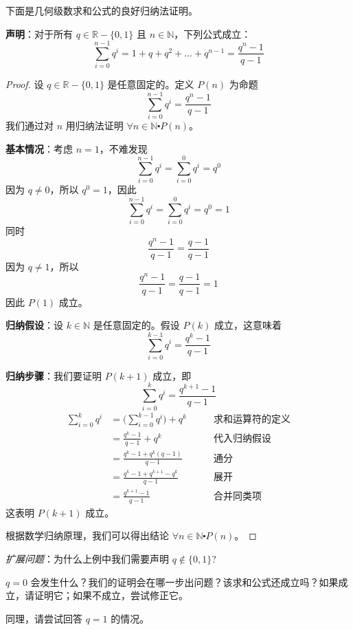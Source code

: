 下面是几何级数求和公式的良好归纳法证明。\\

\begin{example}[几何级数求和公式]
    
    \textbf{声明}：对于所有 $q \in \mathbb{R}-\{0,1\}$ 且 $n \in \mathbb{N}$，下列公式成立：
    \[\sum_{i=0}^{n-1}q^i = 1+q+q^2+\dots+q^{n-1} = \frac{q^n-1}{q-1}\]
\end{example}

\begin{proof}
    设 $q \in \mathbb{R}-\{0,1\}$ 是任意固定的。定义 $P(n)$ 为命题
    \[\sum_{i=0}^{n-1}q^i = \frac{q^n-1}{q-1}\]
    我们通过对 $n$ 用归纳法证明 $\forall n \in \mathbb{N} \centerdot P(n)$。

    \textbf{基本情况}：考虑 $n=1$，不难发现
    \[\sum_{i=0}^{n-1}q^i = \sum_{i=0}^{0}q^i = q^0\]
    因为 $q \neq 0$，所以 $q^0=1$，因此
    \[\sum_{i=0}^{n-1}q^i = \sum_{i=0}^{0}q^i = q^0 = 1\]
    同时
    \[\frac{q^n-1}{q-1} = \frac{q-1}{q-1}\]
    因为 $q \neq 1$，所以
    \[\frac{q^n-1}{q-1} = \frac{q-1}{q-1} = 1\]
    因此 $P(1)$ 成立。

    \textbf{归纳假设}：设 $k \in \mathbb{N}$ 是任意固定的。假设 $P(k)$ 成立，这意味着
    \[\sum_{i=0}^{k-1}q^i = \frac{q^k-1}{q-1}\]

    \textbf{归纳步骤}：我们要证明 $P(k+1)$ 成立，即
    \[\sum_{i=0}^{k}q^i = \frac{q^{k+1}-1}{q-1}\]
    \begin{align*}
        \sum_{i=0}^{k}q^i &= \Bigg(\sum_{i=0}^{k-1}q^i\Bigg)+q^k &\qquad \text{求和运算符的定义}\\
        &= \frac{q^k-1}{q-1} + q^k &\qquad \text{代入归纳假设}\\
        &= \frac{q^k-1+q^k(q-1)}{q-1} &\qquad \text{通分}\\
        &= \frac{q^k-1+q^{k+1}-q^k}{q-1} &\qquad \text{展开}\\ 
        &= \frac{q^{k+1}-1}{q-1} &\qquad \text{合并同类项}
    \end{align*}
    这表明 $P(k+1)$ 成立。

    根据数学归纳原理，我们可以得出结论 $\forall n \in \mathbb{N} \centerdot P(n)$。
\end{proof}

\emph{扩展问题}：为什么上例中我们需要声明 $q \notin \{0, 1\}$?

$q=0$ 会发生什么？我们的证明会在哪一步出问题？该求和公式还成立吗？如果成立，请证明它；如果不成立，尝试修正它。

同理，请尝试回答 $q=1$ 的情况。

